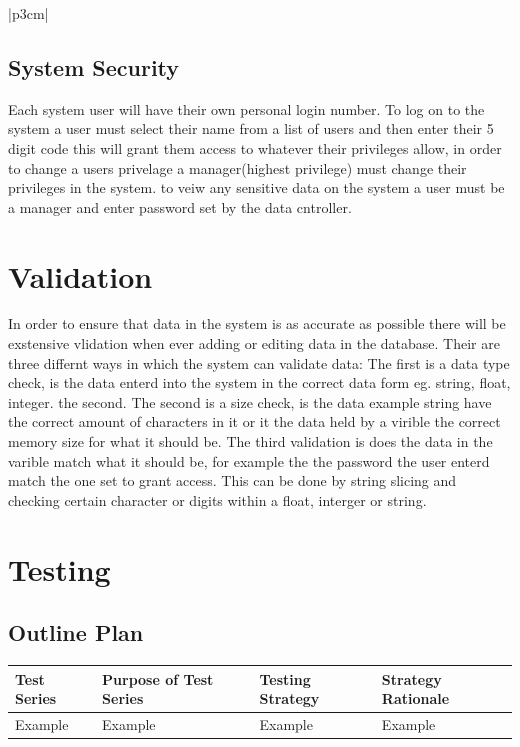 \begin{center}
\begin{tabular}{|p{3cm}|}
\subsection{System Security}

Each system user will have their own personal login number. To log on to the system a user must select their name from a list of users and then enter their 5 digit code this will grant them access to whatever their privileges allow, in order to change a users privelage a manager(highest privilege) must change their privileges in the system. to veiw any sensitive data on the system a user must be a manager and enter password set by the data cntroller.

\section{Validation}

In order to ensure that data in the system is as accurate as possible there will be exstensive vlidation when ever adding or editing data in the database. Their are three differnt ways in which the system can validate data: The first is a data type check, is the data enterd into the system in the correct data form eg. string, float, integer. the second. The second is a size check, is the data example string have the correct amount of characters in it or it the data held by a virible the correct memory size for what it should be. The third validation is does the data in the varible match what it should be, for example the the password the user enterd match the one set to grant access. This can be done by string slicing and checking certain character or digits within a float, interger or string.

\section{Testing}

\begin{landscape}
\subsection{Outline Plan}

\begin{center}
    \begin{tabular}{|p{2cm}|p{5cm}|p{5cm}|p{4cm}|}
        \hline
        \textbf{Test Series} & \textbf{Purpose of Test Series} & \textbf{Testing Strategy} & \textbf{Strategy Rationale}\\ \hline
        Example & Example & Example & Example \\ \hline
    \end{tabular}
\end{center}


\end{landscape}
\end{tabular}
\end{center}
